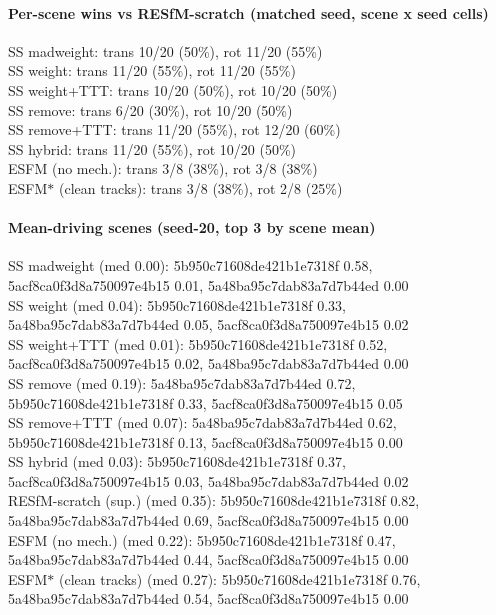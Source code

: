 \documentclass[10pt]{article}
\begin{document}
\paragraph{Per-scene wins vs RESfM-scratch (matched seed, scene x seed cells)}
\indent SS madweight: trans 10/20 (50\%), rot 11/20 (55\%)\\
\indent SS weight: trans 11/20 (55\%), rot 11/20 (55\%)\\
\indent SS weight+TTT: trans 10/20 (50\%), rot 10/20 (50\%)\\
\indent SS remove: trans 6/20 (30\%), rot 10/20 (50\%)\\
\indent SS remove+TTT: trans 11/20 (55\%), rot 12/20 (60\%)\\
\indent SS hybrid: trans 11/20 (55\%), rot 10/20 (50\%)\\
\indent ESFM (no mech.): trans 3/8 (38\%), rot 3/8 (38\%)\\
\indent ESFM$\ast$ (clean tracks): trans 3/8 (38\%), rot 2/8 (25\%)\\
\paragraph{Mean-driving scenes (seed-20, top 3 by scene mean)}
\indent SS madweight (med 0.00): 5b950c71608de421b1e7318f 0.58, 5acf8ca0f3d8a750097e4b15 0.01, 5a48ba95c7dab83a7d7b44ed 0.00\\
\indent SS weight (med 0.04): 5b950c71608de421b1e7318f 0.33, 5a48ba95c7dab83a7d7b44ed 0.05, 5acf8ca0f3d8a750097e4b15 0.02\\
\indent SS weight+TTT (med 0.01): 5b950c71608de421b1e7318f 0.52, 5acf8ca0f3d8a750097e4b15 0.02, 5a48ba95c7dab83a7d7b44ed 0.00\\
\indent SS remove (med 0.19): 5a48ba95c7dab83a7d7b44ed 0.72, 5b950c71608de421b1e7318f 0.33, 5acf8ca0f3d8a750097e4b15 0.05\\
\indent SS remove+TTT (med 0.07): 5a48ba95c7dab83a7d7b44ed 0.62, 5b950c71608de421b1e7318f 0.13, 5acf8ca0f3d8a750097e4b15 0.00\\
\indent SS hybrid (med 0.03): 5b950c71608de421b1e7318f 0.37, 5acf8ca0f3d8a750097e4b15 0.03, 5a48ba95c7dab83a7d7b44ed 0.02\\
\indent RESfM-scratch (sup.) (med 0.35): 5b950c71608de421b1e7318f 0.82, 5a48ba95c7dab83a7d7b44ed 0.69, 5acf8ca0f3d8a750097e4b15 0.00\\
\indent ESFM (no mech.) (med 0.22): 5b950c71608de421b1e7318f 0.47, 5a48ba95c7dab83a7d7b44ed 0.44, 5acf8ca0f3d8a750097e4b15 0.00\\
\indent ESFM$\ast$ (clean tracks) (med 0.27): 5b950c71608de421b1e7318f 0.76, 5a48ba95c7dab83a7d7b44ed 0.54, 5acf8ca0f3d8a750097e4b15 0.00\\
\end{document}
